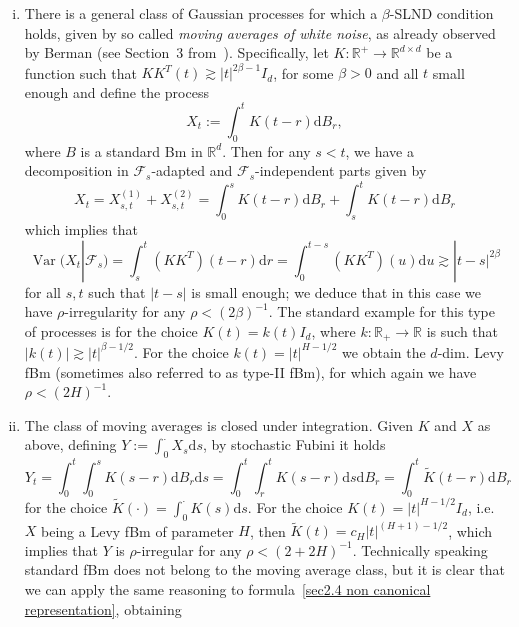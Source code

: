 \documentclass[10pt]{article}
\newcommand{\assign}{:=}
\newcommand{\mathd}{\mathrm{d}}
\newcommand{\nobracket}{}
\newcommand{\tmem}[1]{{\em #1\/}}
\newcommand{\tmop}[1]{\ensuremath{\operatorname{#1}}}
\newenvironment{enumerateroman}{\begin{enumerate}[i.] }{\end{enumerate}}
\begin{document}
\begin{enumerateroman}
    \item There is a general class of Gaussian processes for which a
    $\beta$\mbox{-}SLND condition holds, given by so called {\tmem{moving
    averages of white noise}}, as already observed by Berman (see Section~3
    from~{\cite{berman73}}). Specifically, let $K : \mathbb{R}^+ \rightarrow
    \mathbb{R}^{d \times d}$ be a function such that $K K^T (t) \gtrsim | t
    |^{2 \beta - 1} I_d$, for some $\beta > 0$ and all $t$ small enough and
    define the process
    \[ X_t \assign \int_0^t K (t - r) \mathd B_r, \]
    where $B$ is a standard Bm in $\mathbb{R}^d$. Then for any $s < t$, we
    have a decomposition in $\mathcal{F}_s$-adapted and
    $\mathcal{F}_s$-independent parts given by
    \[ X_t = X_{s, t}^{(1)} + X_{s, t}^{(2)} = \int_0^s K (t - r) \mathd B_r +
       \int_s^t K (t - r) \mathd B_r \]
    which implies that
    \[ \tmop{Var} (X_t | \mathcal{F}_s \nobracket) = \int_s^t (K K^T) (t - r)
       \mathd r = \int_0^{t - s} (K K^T) (u) \mathd u \gtrsim | t - s |^{2
       \beta} \]
    for all $s, t$ such that $| t - s |$ is small enough; we deduce that in
    this case we have $\rho$\mbox{-}irregularity for any $\rho < (2 \beta)^{-
    1}$. The standard example for this type of processes is for the choice $K
    (t) = k (t) I_d$, where $k : \mathbb{R}_+ \rightarrow \mathbb{R}$ is such
    that $| k (t) | \gtrsim | t |^{\beta - 1 / 2}$. For the choice $k (t) = |
    t |^{H - 1 / 2}$ we obtain the $d$-dim. Levy fBm (sometimes also referred
    to as type\mbox{-}II fBm), for which again we have $\rho < (2 H)^{- 1}$.
    
    \item The class of moving averages is closed under integration. Given $K$
    and $X$ as above, defining $Y \assign \int_0^{\cdot} X_s \mathd s$, by
    stochastic Fubini it holds
    \[ Y_t = \int_0^t \int_0^s K (s - r) \mathd B_r \mathd s = \int_0^t
       \int_r^t K (s - r) \mathd s \mathd B_r = \int_0^t \tilde{K} (t - r)
       \mathd B_r \]
    for the choice $\tilde{K} (\cdot) = \int_0^{\cdot} K (s) \mathd s$. For
    the choice $K (t) = | t |^{H - 1 / 2} I_d$, i.e. $X$ being a Levy fBm of
    parameter $H$, then $\tilde{K} (t) = c_H | t |^{(H + 1) - 1 / 2}$, which
    implies that $Y$ is $\rho$\mbox{-}irregular for any $\rho < (2 + 2 H)^{-
    1}$. Technically speaking standard fBm does not belong to the moving
    average class, but it is clear that we can apply the same reasoning to
    formula~{\eqref{sec2.4 non canonical representation}}, obtaining
    

\end{enumerateroman}
\end{document}
